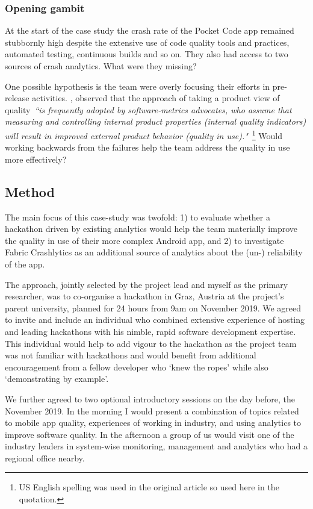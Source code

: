 \subsubsection{Opening gambit}
At the start of the case study the crash rate of the Pocket Code app remained stubbornly high despite the extensive use of code quality tools and practices, automated testing, continuous builds and so on. They also had access to two sources of crash analytics. What were they missing?

One possible hypothesis is the team were overly focusing their efforts in pre-release activities. \citep{kitchenham1996_software_quality_elusive_target}, observed that the approach of taking a product view of quality~\emph{``is frequently adopted by software-metrics advocates, who assume that measuring and controlling internal product properties (internal quality indicators) will result in improved external product behavior (quality in use)."}~\footnote{US English spelling was used in the original article so used here in the quotation.} Would working backwards from the failures help the team address the quality in use more effectively?

\subsection{Method}
The main focus of this case-study was twofold: 1) to evaluate whether a hackathon driven by existing analytics would help the team materially improve the quality in use of their more complex Android app, and 2) to investigate Fabric Crashlytics as an additional source of analytics about the (un-) reliability of the app.

The approach, jointly selected by the project lead %
and myself as the primary researcher,
was to co-organise a hackathon in Graz, Austria at the project's parent university, planned for 24 hours from 9am on  November 2019. We agreed to invite and include an individual who combined extensive experience of hosting and leading hackathons with his nimble, rapid software development expertise. This individual would help to add vigour to the hackathon as the project team was not familiar with hackathons and would benefit from additional encouragement from a fellow developer who `knew the ropes' while also `demonstrating by example'.

We further agreed to two optional introductory sessions on the day before, the~ November 2019. In the morning I would present a combination of topics related to mobile app quality, experiences of working in industry, and using analytics to improve software quality. In the afternoon a group of us would visit one of the industry leaders in system-wise monitoring, management and analytics who had a regional office nearby.



